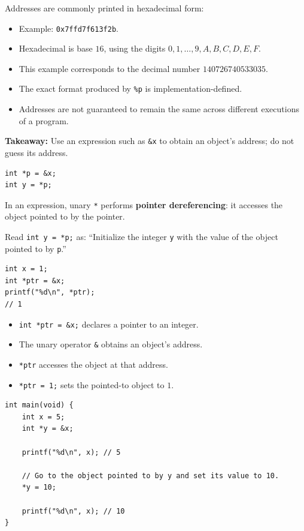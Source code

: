 \documentclass[11pt,a4paper]{article}
\begin{document}
Addresses are commonly printed in hexadecimal form:
\begin{itemize}
    \item Example: \texttt{0x7ffd7f613f2b}.
    \item Hexadecimal is base \(16\), using the digits
          \(0,1,\ldots,9,A,B,C,D,E,F\).
    \item This example corresponds to the decimal number
          \(140726740533035\).
    \item The exact format produced by \texttt{\%p} is
          implementation-defined.
    \item Addresses are not guaranteed to remain the same across
          different executions of a program.
\end{itemize}

\textbf{Takeaway:}
Use an expression such as \texttt{\&x} to obtain an object's
address; do not guess its address.


\begin{lstlisting}[style=cscode]
int *p = &x;
int y = *p;
\end{lstlisting}

In an expression, unary \texttt{*} performs
\textbf{pointer dereferencing}: it accesses the object pointed to
by the pointer.

Read \texttt{int y = *p;} as:
``Initialize the integer \texttt{y} with the value of the object
pointed to by \texttt{p}.''

\begin{lstlisting}[style=cscode]
int x = 1;
int *ptr = &x;
printf("%d\n", *ptr);
// 1
\end{lstlisting}

\begin{itemize}
    \item \texttt{int *ptr = \&x;} declares a pointer to an integer.
    \item The unary operator \texttt{\&} obtains an object's address.
    \item \texttt{*ptr} accesses the object at that address.
    \item \texttt{*ptr = 1;} sets the pointed-to object to \(1\).
\end{itemize}

\begin{lstlisting}[style=cscode]
int main(void) {
    int x = 5;
    int *y = &x;

    printf("%d\n", x); // 5

    // Go to the object pointed to by y and set its value to 10.
    *y = 10;

    printf("%d\n", x); // 10
}
\end{lstlisting}
\end{document}
